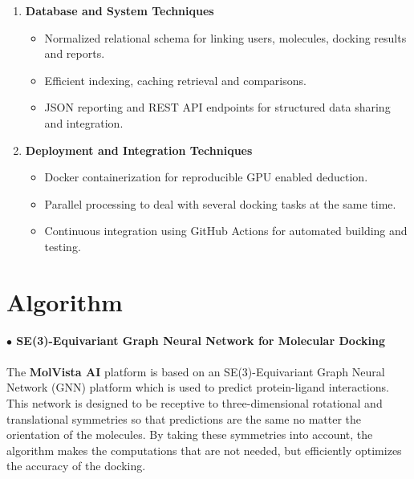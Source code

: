 \documentclass[12pt,a4]{report}
\begin{document}
\begin{itemize}
\begin{enumerate}
\vspace{0.3cm}
\item \textbf{Database and System Techniques}
\begin{itemize}
    \item Normalized relational schema for linking users, molecules, docking results and reports.
    \item Efficient indexing, caching retrieval and comparisons.
    \item JSON reporting and REST API endpoints for structured data sharing and integration.
\end{itemize}

\vspace{0.3cm}
\item \textbf{Deployment and Integration Techniques}
\begin{itemize}
    \item Docker containerization for reproducible GPU enabled deduction.
    \item Parallel processing to deal with several docking tasks at the same time.
    \item Continuous integration using GitHub Actions for automated building and testing.
\end{itemize}

\end{enumerate}
\end{itemize}

\section{Algorithm}
\noindent\textbf{\large $\bullet$ SE(3)-Equivariant Graph Neural Network for Molecular Docking}\\\\
\hspace{0.3in}
The \textbf{MolVista AI} platform is based on an SE(3)-Equivariant Graph Neural Network (GNN) platform which is used to predict protein-ligand interactions. This network is designed to be receptive to three-dimensional rotational and translational symmetries so that predictions are the same no matter the orientation of the molecules. By taking these symmetries into account, the algorithm makes the computations that are not needed, but efficiently optimizes the accuracy of the docking.
\end{document}
